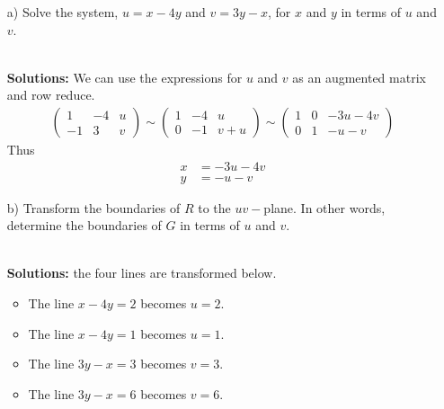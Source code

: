     \begin{enumerate}
        \item[a)] Solve the system, $u=x-4y$ and $v=3y-x$, for $x$ and $y$ in terms of $u$ and $v$.
            \ifnum {} {\color{DarkBlue} \\[12pt] 
            \textbf{Solutions:}
            We can use the expressions for $u$ and $v$ as an augmented matrix and row reduce. 
            \begin{align}
                \begin{pmatrix} 1 & -4 & u \\ -1 & 3 & v\end{pmatrix} 
                \sim \begin{pmatrix} 1 & -4 & u \\0 & -1 & v + u\end{pmatrix} 
                \sim \begin{pmatrix} 1 & 0 & -3u-4v\\0 & 1 & -u-v\end{pmatrix} 
            \end{align}
            Thus
            \begin{align}
                x &=  -3u-4v\\
                y &= -u-v
            \end{align}

            } 
            \else 
            \vspace{5cm}
            \fi
        \item[b)] Transform the boundaries of $R$ to the $uv-$plane. In other words, determine the boundaries of $G$ in terms of $u$ and $v$. 
            \ifnum {} {\color{DarkBlue} \\[12pt] 
            \textbf{Solutions:} the four lines are transformed below. 
            \begin{itemize}
                \item The line $x-4y=2$ becomes $u=2$. 
                \item The line $x-4y=1$ becomes $u=1$. 
                \item The line $3y-x=3$ becomes $v=3$. 
                \item The line $3y-x=6$ becomes $v=6$. 
            \end{itemize}
            } 
        \else 
        \vspace{5cm}
        \fi        
            

\end{enumerate}
